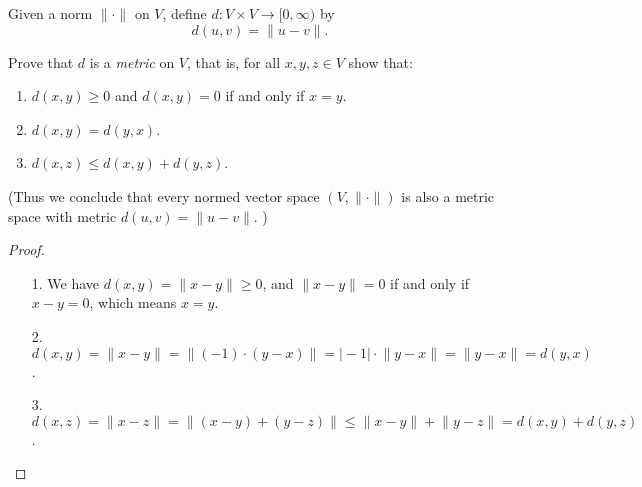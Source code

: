 \begin{problem}[10 pts]
Given a norm $\|\cdot\|$ on $V$, define $d : V \times V \to [0,\infty)$ by
\[
d(u,v) = \|u-v\|.
\]


 Prove that $d$ is a \emph{metric} on $V$, that is, for all $x,y,z \in V$ show that:
  \begin{enumerate}
    \item $d(x,y) \geq 0$ and $d(x,y)=0$ if and only if $x=y$.
    \item $d(x,y) = d(y,x)$.
    \item $d(x,z) \leq d(x,y) + d(y,z)$.
  \end{enumerate}
(Thus we conclude that every normed vector space $(V,\|\cdot\|)$ is also a metric space with metric $d(u,v)=\|u-v\|$.
)
\end{problem}
\begin{proof}
  \vphantom{text}
  \begin{itemize}
    \item [1.] We have \(d(x, y) = \lVert x - y \rVert \ge 0\), and \(\lVert x - y \rVert = 0\) if and only if \(x-y=0\), which means \(x=y\).    
    \item [2.] \(d(x,y) = \lVert x - y \rVert = \lVert (-1) \cdot (y-x) \rVert = \vert -1 \vert \cdot \lVert y - x \rVert = \lVert y - x \rVert = d(y,x)\). 
    \item [3.] \(d(x, z) = \lVert x - z \rVert = \lVert (x - y) + (y - z) \rVert \le \lVert x - y \rVert + \lVert y - z \rVert = d(x,y) + d(y,z)\). 
  \end{itemize}
\end{proof}

